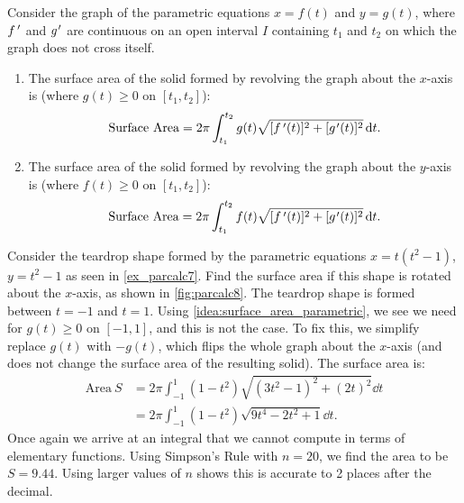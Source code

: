 \begin{keyidea}\label{idea:surface_area_parametric}%
Consider the graph of the parametric equations $x=f(t)$ and $y=g(t)$, where $f\,'$ and $g\primeskip'$ are continuous on an open interval $I$ containing $t_1$ and $t_2$ on which the graph does not cross itself.
\begin{enumerate}
	\item	The surface area of the solid formed by revolving the graph about the $x$-axis is (where $g(t)\geq0$ on $[t_1,t_2]$):
\[
\text{Surface Area}
= 2\pi\int_{t_1}^{t_2} g(t)\sqrt{[\fp(t)]^2+[g\primeskip'(t)]^2}\dd t.
\]
	
	\item	The surface area of the solid formed by revolving the graph about the $y$-axis is (where $f(t)\geq0$ on $[t_1,t_2]$):
\[
\text{Surface Area}
= 2\pi\int_{t_1}^{t_2} f(t)\sqrt{[\fp(t)]^2+[g\primeskip'(t)]^2}\dd t.
\]
\end{enumerate}
\end{keyidea}

\begin{example}\label{ex_parcalc8}%
%
%
Consider the teardrop shape formed by the parametric equations $x=t(t^2-1)$, $y=t^2-1$ as seen in \autoref{ex_parcalc7}. Find the surface area if this shape is rotated about the $x$-axis, as shown in \autoref{fig:parcalc8}.
\solution
The teardrop shape is formed between $t=-1$ and $t=1$. Using \autoref{idea:surface_area_parametric}, we see we need for $g(t)\geq 0$ on $[-1,1]$, and this is not the case. To fix this, we simplify replace $g(t)$ with $-g(t)$, which flips the whole graph about the $x$-axis (and does not change the surface area of the resulting solid). The surface area is: 
\begin{align*}
\text{Area}\ S &= 2\pi\int_{-1}^1 (1-t^2)\sqrt{(3t^2-1)^2+(2t)^2}\dd t\\
		&=	2\pi\int_{-1}^1 (1-t^2)\sqrt{9t^4-2t^2+1} \dd t.
		\end{align*}
Once again we arrive at an integral that we cannot compute in terms of elementary functions. Using Simpson's Rule with $n=20$, we find the area to be $S=9.44$. Using larger values of $n$ shows this is accurate to 2 places after the decimal.
\end{example}

